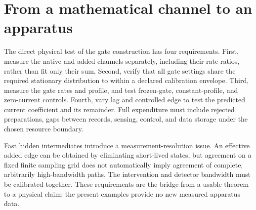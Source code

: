 \section{From a mathematical channel to an apparatus}

The direct physical test of the gate construction has four requirements.
First, measure the native and added channels separately, including their
rate ratios, rather than fit only their sum. Second, verify that all gate
settings share the required stationary distribution to within a declared
calibration envelope. Third, measure the gate rates and profile, and test
frozen-gate, constant-profile, and zero-current controls. Fourth, vary lag and
controlled edge to test the predicted current coefficient and its remainder.
Full expenditure must include rejected preparations, gaps between records,
sensing, control, and data storage under the chosen resource boundary.

Fast hidden intermediates introduce a measurement-resolution issue. An
effective added edge can be obtained by eliminating short-lived states, but
agreement on a fixed finite sampling grid does not automatically imply
agreement of complete, arbitrarily high-bandwidth paths. The intervention
and detector bandwidth must be calibrated together. These requirements are
the bridge from a usable theorem to a physical claim; the present examples
provide no new measured apparatus data.
